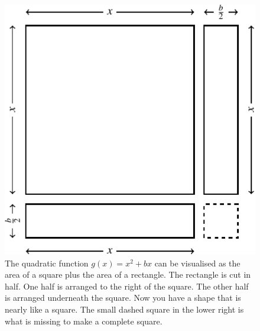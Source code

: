 \documentclass[a4paper,oneside,12pt]{article}
\begin{document}
\begin{figure}[!htbp]
\centering
\includegraphics[scale=1.1]{image/10/complete-square-a1-c0_halfb.pdf}
\caption{%
  The quadratic function $g(x) = x^2 + bx$ can be visualised as the
  area of a square plus the area of a rectangle.  The rectangle is cut
  in half.  One half is arranged to the right of the square.  The
  other half is arranged underneath the square.  Now you have a shape
  that is nearly like a square.  The small dashed square in the lower
  right is what is missing to make a complete square.
}
\label{fig:quadroots:special_complete_square_nearly_square}
\end{figure}
\end{document}
